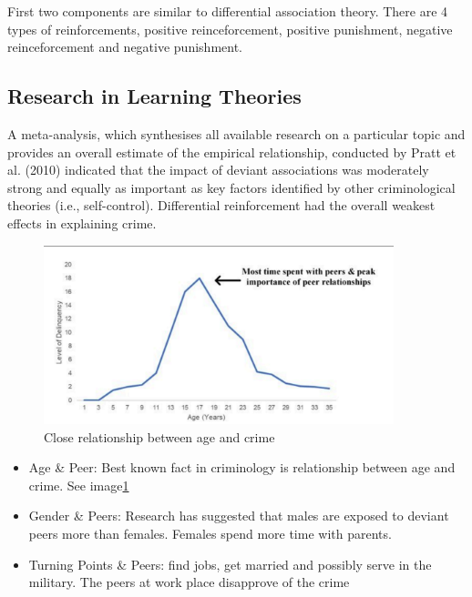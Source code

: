 \documentclass{article}
\begin{document}
First two components are similar to differential association theory. There are 4 types of reinforcements, positive reinceforcement, positive punishment, negative reinceforcement and negative punishment.

\subsection{Research in Learning Theories}

A meta-analysis, which synthesises all available research on a particular topic and provides an overall estimate of the empirical relationship, conducted by Pratt et al. (2010) indicated that the impact of deviant associations was moderately strong and equally as important as key factors identified by other criminological theories (i.e., self-control). Differential reinforcement had the overall weakest effects in explaining crime.

\begin{figure}
    \begin{center}
        \includegraphics[width = 4in]{Age_Crime.png}
    \end{center}
    \caption{Close relationship between age and crime}
    \label{AgeCrime}
\end{figure}

\begin{itemize}
    \item Age \& Peer: Best known fact in criminology is relationship between age and crime. See image\ref{AgeCrime}
    
    \item Gender \& Peers: Research has suggested that males are exposed to deviant peers more than females. Females spend more time with parents.
    
    \item Turning Points \& Peers: find jobs, get married and possibly serve in the military. The peers at work place disapprove of the crime
\end{itemize}
\end{document}
